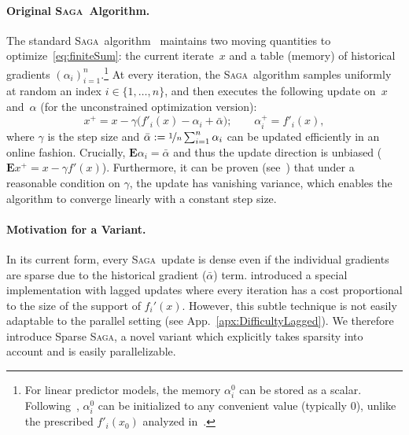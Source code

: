 \documentclass[twoside]{article}
\newcommand{\stepsize}{\gamma}
\newcommand{\Econd}{\mathbf{E}}
\newcommand{\SAGA}{\textsc{Saga}}
\begin{document}
\paragraph{Original \SAGA\ Algorithm.} The standard \SAGA\ algorithm~\citep{SAGA} maintains two moving quantities to optimize~\eqref{eq:finiteSum}: the current iterate~$x$ and a table (memory) of historical gradients $(\alpha_i)_{i=1}^n$.\footnote{For linear predictor models, the memory $\alpha_i^0$ can be stored as a scalar. Following~\cite{qsaga}, $\alpha_i^0$ can be initialized to any convenient value (typically $0$), unlike the prescribed $f'_i(x_0)$ analyzed in~\citet{SAGA}.}
At every iteration, the \SAGA\ algorithm samples uniformly at random an index $i \in \{1,\ldots, n\}$, and then executes the following update on~$x$ and~$\alpha$ (for the unconstrained optimization version):
\begin{equation}\label{eq:SAGAupdate}
x^{+} = x - \stepsize \big(f'_i(x) - \alpha_i + \bar \alpha\big); \qquad  \alpha_i^+ = f'_i(x),
\end{equation}
where $\stepsize$ is the step size and $\bar \alpha := \nicefrac{1}{n} \sum_{i=1}^n \alpha_i$ can be updated efficiently in an online fashion. Crucially, $\Econd \alpha_i = \bar \alpha$ and thus the update direction is unbiased ($\Econd x^{+} = x - \stepsize f'(x)$). 
Furthermore, it can be proven (see~\citet{SAGA}) that under a reasonable condition on $\stepsize$, the update has vanishing variance, which enables the algorithm to converge linearly with a constant step size.

\vspace{-2mm}
\paragraph{Motivation for a Variant.}
In its current form, every \SAGA\ update is dense even if the individual gradients are sparse due to the historical gradient ($\bar \alpha$) term. 
\citet{laggedsaga} introduced a special implementation with lagged updates where every iteration has a cost proportional to the size of the support of $f_i'(x)$. 
However, this subtle technique is not easily adaptable  to the parallel setting (see App.~\ref{apx:DifficultyLagged}). 
We therefore introduce Sparse \SAGA, a novel variant which explicitly takes sparsity into account and is easily parallelizable. 

\vspace{-2mm}
\end{document}
